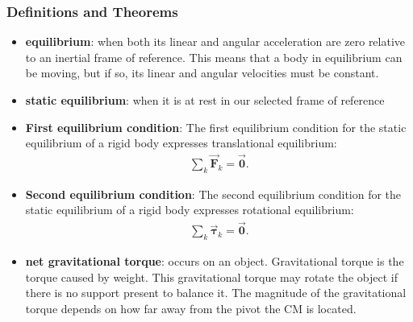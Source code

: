 \documentclass{report}
\begin{document}
    \subsubsection{Definitions and Theorems}
    \begin{itemize}
        \item \textbf{equilibrium}: when both its linear and angular acceleration are zero relative to an inertial frame of reference. This means that a body in equilibrium can be moving, but if so, its linear and angular velocities must be constant.
        \item \textbf{static equilibrium}: when it is at rest in our selected frame of reference
        \item \textbf{First equilibrium condition}:
            The first equilibrium condition for the static equilibrium of a rigid body expresses translational equilibrium:
            \begin{align*}
                \sum_k \vec{\mathbf{F}}_{k} = \vec{\mathbf{0}}
            .\end{align*}
        \item \textbf{Second equilibrium condition}:
            The second equilibrium condition for the static equilibrium of a rigid body expresses rotational equilibrium:
            \begin{align*}
                \sum_k \vec{\mathbf{\tau}}_{k} = \vec{\mathbf{0}}
            .\end{align*}
        \item \textbf{net gravitational torque}: occurs on an object.
            \bigbreak \noindent 
            Gravitational torque is the torque caused by weight. This gravitational torque may rotate the object if there is no support present to balance it. The magnitude of the gravitational torque depends on how far away from the pivot the CM is located.

\end{itemize}
\end{document}
